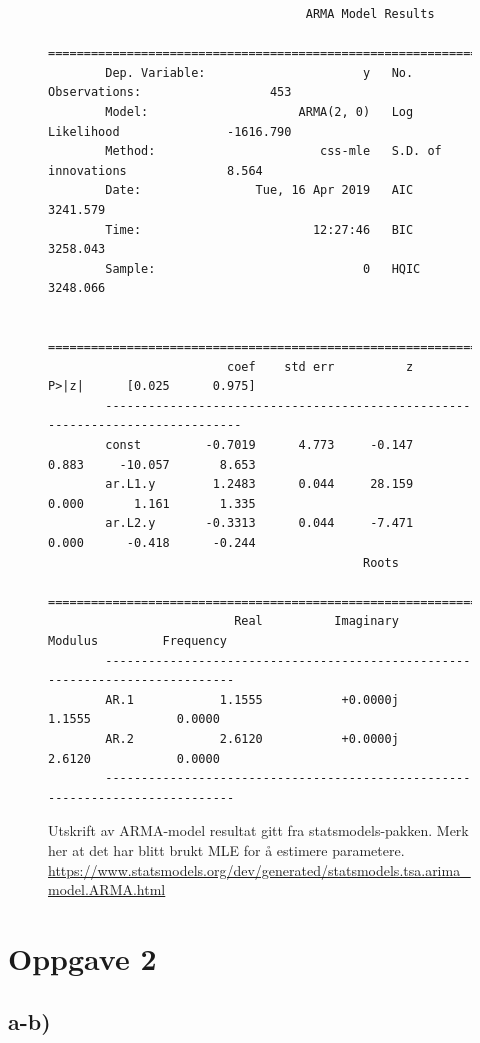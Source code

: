 \begin{figure}[hbt!]
    \begin{lstlisting}
                                    ARMA Model Results
        ==============================================================================
        Dep. Variable:                      y   No. Observations:                  453
        Model:                     ARMA(2, 0)   Log Likelihood               -1616.790
        Method:                       css-mle   S.D. of innovations              8.564
        Date:                Tue, 16 Apr 2019   AIC                           3241.579
        Time:                        12:27:46   BIC                           3258.043
        Sample:                             0   HQIC                          3248.066
        
        ==============================================================================
                         coef    std err          z      P>|z|      [0.025      0.975]
        ------------------------------------------------------------------------------
        const         -0.7019      4.773     -0.147      0.883     -10.057       8.653
        ar.L1.y        1.2483      0.044     28.159      0.000       1.161       1.335
        ar.L2.y       -0.3313      0.044     -7.471      0.000      -0.418      -0.244
                                            Roots
        =============================================================================
                          Real          Imaginary           Modulus         Frequency
        -----------------------------------------------------------------------------
        AR.1            1.1555           +0.0000j            1.1555            0.0000
        AR.2            2.6120           +0.0000j            2.6120            0.0000
        -----------------------------------------------------------------------------
    \end{lstlisting}
\caption{Utskrift av ARMA-model resultat gitt fra statsmodels-pakken. Merk her at det har blitt brukt MLE for å estimere parametere. \url{https://www.statsmodels.org/dev/generated/statsmodels.tsa.arima\_model.ARMA.html}}
\label{Armacoefs}
\end{figure}



\section{Oppgave 2}
\subsection{a-b)}

